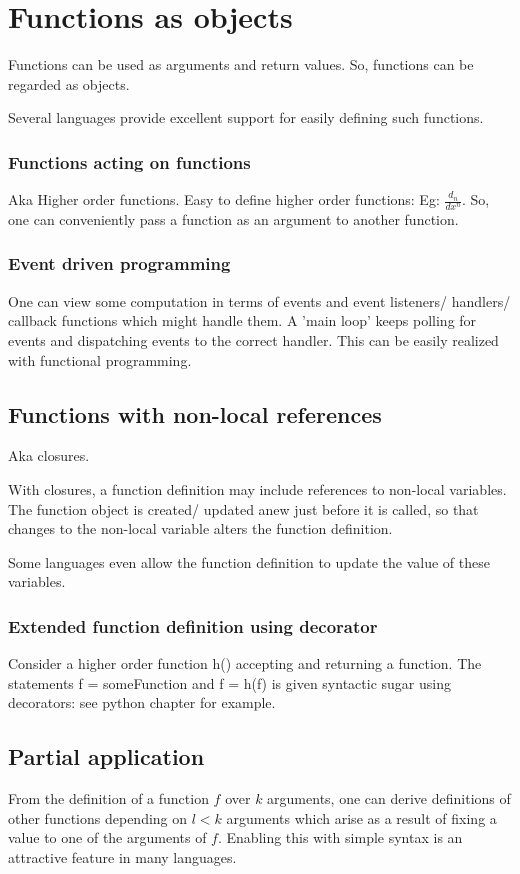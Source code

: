\documentclass[oneside, article]{memoir}
\begin{document}
\section{Functions as objects}
Functions can be used as arguments and return values. So, functions can be regarded as objects.

Several languages provide excellent support for easily defining such functions.

\subsubsection{Functions acting on functions}
Aka Higher order functions. Easy to define higher order functions: Eg: $\frac{d_{n}}{dx^{n}}$. So, one can conveniently pass a function as an argument to another function.

\subsubsection{Event driven programming}
One can view some computation in terms of events and event listeners/ handlers/ callback functions which might handle them. A 'main loop' keeps polling for events and dispatching events to the correct handler. This can be easily realized with functional programming.

\subsection{Functions with non-local references}
Aka closures.

With closures, a function definition may include references to non-local variables. The function object is created/ updated anew just before it is called, so that changes to the non-local variable alters the function definition.

Some languages even allow the function definition to update the value of these variables.

\subsubsection{Extended function definition using decorator}
Consider a higher order function h() accepting and returning a function. The statements f = someFunction and f = h(f) is given syntactic sugar using decorators: see python chapter for example. 

\subsection{Partial application}
From the definition of a function $f$ over $k$ arguments, one can derive definitions of other functions depending on $l<k$ arguments which arise as a result of fixing a value to one of the arguments of $f$. Enabling this with simple syntax is an attractive feature in many languages.
\end{document}
